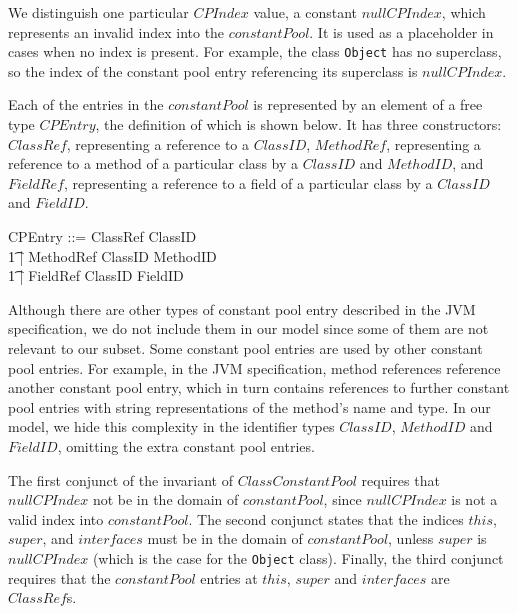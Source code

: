 We distinguish one particular $CPIndex$ value, a constant
$nullCPIndex$, which represents an invalid index into the
$constantPool$.
It is used as a placeholder in cases when no index is present.
For example, the class \texttt{Object} has no superclass, so the index
of the constant pool entry referencing its superclass is
$nullCPIndex$.

Each of the entries in the $constantPool$ is represented by an element
of a free type $CPEntry$, the definition of which is shown below.
It has three constructors:~$ClassRef$, representing a reference to a
$ClassID$, $MethodRef$, representing a reference to a method of a
particular class by a $ClassID$ and $MethodID$, and $FieldRef$,
representing a reference to a field of a particular class by a
$ClassID$ and $FieldID$.
\begin{zed}
  CPEntry ::= ClassRef \ldata ClassID \rdata \\
  \t1 | MethodRef \ldata ClassID \cross MethodID \rdata \\
  \t1 | FieldRef \ldata ClassID \cross FieldID \rdata
\end{zed}
Although there are other types of constant pool entry described in the
JVM specification, we do not include them in our model since some of
them are not relevant to our subset. 
Some constant pool entries are used by other constant pool entries.
For example, in the JVM specification, method references reference
another constant pool entry, which in turn contains references to
further constant pool entries with string representations of the
method's name and type.
In our model, we hide this complexity in the identifier types
$ClassID$, $MethodID$ and $FieldID$, omitting the extra constant pool
entries.

The first conjunct of the invariant of $ClassConstantPool$ requires
that $nullCPIndex$ not be in the domain of $constantPool$, since
$nullCPIndex$ is not a valid index into $constantPool$.
The second conjunct states that the indices $this$, $super$, and
$interfaces$ must be in the domain of $constantPool$, unless $super$
is $nullCPIndex$ (which is the case for the \texttt{Object} class).
Finally, the third conjunct requires that the $constantPool$ entries
at $this$, $super$ and $interfaces$ are $ClassRef$s.


